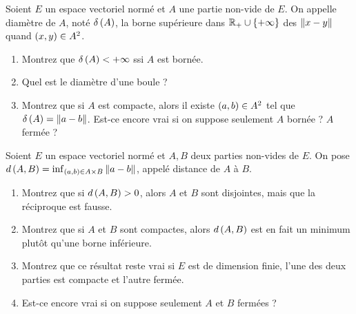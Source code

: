 \begin{exoss}[Exercice 23]
Soient \(E\) un espace vectoriel normé et \(A\) une partie non-vide de \(E\). On appelle diamètre de \(A\), noté \(\delta\left(A\right)\), la borne supérieure dans \(\mathbb{R}_+\cup\left\lbrace+\infty\right\rbrace\) des \(\left\|x-y\right\|\) quand \(\left(x,y\right)\in A^2\).

\begin{enumerate}
    \item Montrez que \(\delta\left(A\right)<+\infty\) ssi \(A\) est bornée. \\
    \item Quel est le diamètre d'une boule ? \\
    \item Montrez que si \(A\) est compacte, alors il existe \(\left(a,b\right)\in A^2\) tel que \(\delta\left(A\right)=\left\|a-b\right\|\). Est-ce encore vrai si on suppose seulement \(A\) bornée ? \(A\) fermée ?
\end{enumerate}
\end{exoss}

\begin{corr}
\end{corr}

\begin{exopss}[Exercice 24]
Soient \(E\) un espace vectoriel normé et \(A,B\) deux parties non-vides de \(E\). On pose \(d\left(A,B\right)=\inf_{\left(a,b\right)\in A\times B}\left\|a-b\right\|\), appelé distance de \(A\) à \(B\).

\begin{enumerate}
    \item Montrez que si \(d\left(A,B\right)>0\), alors \(A\) et \(B\) sont disjointes, mais que la réciproque est fausse. \\
    \item Montrez que si \(A\) et \(B\) sont compactes, alors \(d\left(A,B\right)\) est en fait un minimum plutôt qu'une borne inférieure. \\
    \item Montrez que ce résultat reste vrai si \(E\) est de dimension finie, l'une des deux parties est compacte et l'autre fermée. \\
    \item Est-ce encore vrai si on suppose seulement \(A\) et \(B\) fermées ?
\end{enumerate}
\end{exopss}

\begin{corr}
\end{corr}

